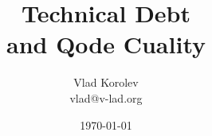 \documentclass{beamer}
\title{Technical Debt  \\ and Qode Cuality  }
\subtitle{}
\author{Vlad Korolev \\ vlad@v-lad.org}
\date[]{ \today}
\begin{document}
{
\begin{frame}
  \titlepage
\end{frame}
}



\end{document}
